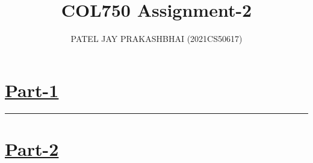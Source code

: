 \documentclass[12pt]{article}
\title{COL750 Assignment-2}
\author{PATEL JAY PRAKASHBHAI (2021CS50617)}
\date{}
\begin{document}
\maketitle

\newcommand{\krip}[1]{%
    \if\relax\detokenize{#1}\relax
        \( M = \langle S, \sim, V \rangle \)%
    \else
        \( M|_{\phi_{#1}} = \langle S^{(#1)}, \sim^{(#1)}, V^{(#1)} \rangle \)%
    \fi
}
\newcommand{\lr}[2]{%
    \forall l \in \{#2\}^{#1-1},
    \forall r \in \{#2\}^{n-#1}%
}
\newcommand{\lrc}[1]{%
    \forall l \in \{0,1\}^{\the\numexpr#1-1\relax},
    \forall r \in \{0,1\}^{n-#1}%
}
\newcommand{\an}{%
    \bigvee\limits_{i=1}^{n} 1_{ci}
}
\newcommand{\ani}[1]{%
    \bigwedge\limits_{#1=1}^{n} \neg K_{c#1}1_{c#1} \land \neg K_{c#1}0_{c#1}
}
\newcommand{\eq}[1]{%
    \eqref{eq:#1}
}
\newcommand{\hl}[1]{%
    \noindent\rule{\textwidth}{#1pt}
}

\section*{\underline{Part-1}}





\hl{1}

\section*{\underline{Part-2}}

\end{document}
